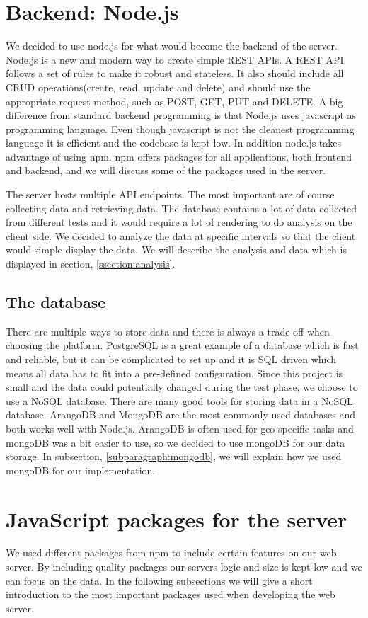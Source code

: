 \documentclass[USenglish]{ifimaster}  %
\begin{document}
\section{Backend: Node.js}
We decided to use node.js for what would become the backend of the server. Node.js is a new and modern way to create simple REST APIs. A REST API follows a set of rules to make it robust and stateless. It also should include all CRUD operations(create, read, update and delete) and should use the appropriate request method, such as POST, GET, PUT and DELETE. A big difference from standard backend programming is that Node.js uses javascript as programming language. Even though javascript is not the cleanest programming language it is efficient and the codebase is kept low. In addition node.js takes advantage of using \acrfull{npm}. \acrshort{npm} offers packages for all applications, both frontend and backend, and we will discuss some of the packages used in the server.

The server hosts multiple API endpoints. The most important are of course collecting data and retrieving data. The database contains a lot of data collected from different tests and it would require a lot of rendering to do analysis on the client side. We decided to analyze the data at specific intervals so that the client would simple display the data. We will describe the analysis and data which is displayed in section, \vref{ssection:analysis}.

\subsection{The database}
There are multiple ways to store data and there is always a trade off when choosing the platform. PostgreSQL is a great example of a database which is fast and reliable, but it can be complicated to set up and it is SQL driven which means all data has to fit into a pre-defined configuration. Since this project is small and the data could potentially changed during the test phase, we choose to use a NoSQL database. There are many good tools for storing data in a NoSQL database. ArangoDB and MongoDB are the most commonly used databases and both works well with Node.js. ArangoDB is often used for geo specific tasks and mongoDB was a bit easier to use, so we decided to use mongoDB for our data storage. In subsection, \vref{subparagraph:mongodb}, we will explain how we used mongoDB for our implementation.

\section{JavaScript packages for the server}
We used different packages from \acrfull{npm} to include certain features on our web server. By including quality packages our servers logic and size is kept low and we can focus on the data. In the following subsections we will give a short introduction to the most important packages used when developing the web server.
\end{document}
